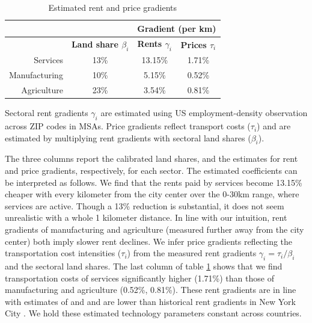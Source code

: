 \documentclass[12pt]{article}
\begin{document}
\begin{table}[h!]
  \begin{center}
  \caption{Estimated rent and price gradients}
    \begin{tabular}{rccc}
    \toprule
    \textbf{} & \textbf{} & \multicolumn{2}{c}{\textbf{Gradient (per km)}}\\
    \midrule
    \textbf{} & \textbf{Land share $\beta_i$ } & \textbf{Rents $\gamma_i$} & \textbf{Prices $\tau_i$} \\
    Services & 13\%  & 13.15\% & 1.71\% \\
    Manufacturing & 10\%  & 5.15\% & 0.52\% \\
    Agriculture & 23\%  & 3.54\% & 0.81\% \\
    \bottomrule
    \end{tabular}%

  \end{center}
  \label{tab:EmpGrad}%

  \noindent \footnotesize{Sectoral rent gradients $\gamma_i$ are estimated using US employment-density observation across ZIP codes in MSAs. Price gradients reflect transport costs ($\tau_i$) and are estimated by multiplying rent gradients with sectoral land shares ($\beta_i$). }
\end{table}%

The three columns report the calibrated land shares, and the estimates for rent and price gradients, respectively, for each sector. The estimated coefficients can be interpreted as follows. We find that the rents paid by services become 13.15\% cheaper with every kilometer from the city center over the 0-30km range, where services are active. Though a 13\% reduction is substantial, it does not seem unrealistic with a whole 1 kilometer distance. In line with our intuition, rent gradients of manufacturing and agriculture (measured further away from the city center) both imply slower rent declines. We infer price gradients reflecting the transportation cost intensities ($\tau_i$) from the measured rent gradients $\gamma_i=\tau_i/\beta_i$ and the sectoral land shares. The last column of table \ref{tab:EmpGrad} shows that we find transportation costs of services significantly higher (1.71\%) than those of manufacturing and agriculture (0.52\%, 0.81\%). These rent gradients are in line with estimates of  and  and are lower than historical rent gradients in New York City \cite{Atack1998}. We hold these estimated technology parameters constant across countries. 
\end{document}
